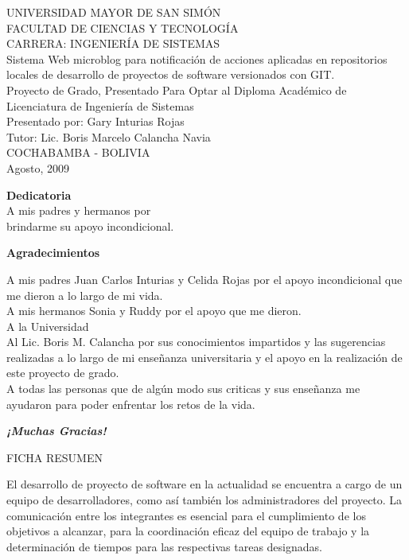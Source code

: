 \documentclass[letterpaper, 12pt,double,graphicx,caption,rotating]{report}
\begin{document}
\begin{titlepage}
\newpage
\begin{center}
UNIVERSIDAD MAYOR DE SAN SIMÓN\\
FACULTAD DE CIENCIAS Y TECNOLOGÍA\\
CARRERA: INGENIERÍA DE SISTEMAS\\[3cm]
{\Large Sistema Web microblog para notificación de acciones aplicadas en repositorios locales de desarrollo de proyectos de software versionados con GIT.}\\[2cm]
{\Large Proyecto de Grado, Presentado Para Optar al Diploma Académico de Licenciatura de Ingeniería de Sistemas}\\[2cm]
{\Large Presentado por: Gary Inturias Rojas}\\[1cm]
{\Large Tutor: Lic. Boris Marcelo Calancha Navia }\\[2PT]
COCHABAMBA - BOLIVIA\\
Agosto, 2009
\end{center}
\newpage

\begin{flushright}
    {\Large \textbf{Dedicatoria}}\\[1cm]
    A mis padres y hermanos por\\ brindarme su apoyo incondicional. \\
\end{flushright}
\newpage

\begin{center}
{\Large \textbf{Agradecimientos}}\\[2cm]
{\leftskip=8cm
A mis padres Juan Carlos Inturias y Celida Rojas por el apoyo incondicional que me dieron a lo largo de mi vida.\\
A mis hermanos Sonia y Ruddy por el apoyo que me dieron.\\
A la Universidad\\
Al Lic. Boris M. Calancha por sus conocimientos impartidos y las sugerencias realizadas a lo largo de mi enseñanza universitaria y el apoyo en la realización de este proyecto de grado.\\
A todas las personas que de algún modo sus criticas y sus enseñanza me ayudaron para poder enfrentar los retos de la vida.\\[3cm]
\par}
\textbf{\textit{¡Muchas Gracias!}}
\end{center}
\newpage
\begin{center}
 {\Large FICHA RESUMEN}\\
\end{center}
El desarrollo de proyecto de software en la actualidad se encuentra a cargo de un equipo de desarrolladores, como así también los administradores del proyecto.
La comunicación entre los integrantes es esencial para el cumplimiento de los objetivos a alcanzar, para la coordinación eficaz del equipo de trabajo y la determinación de tiempos para las respectivas tareas designadas.\\


\end{titlepage}
\end{document}
